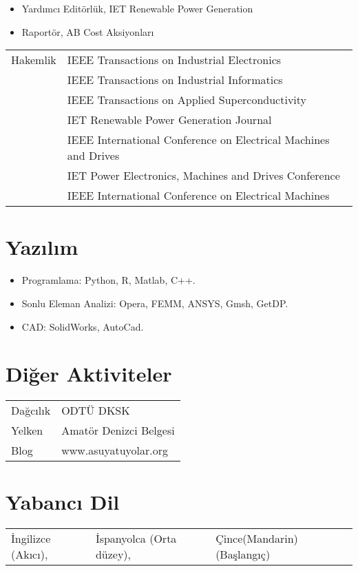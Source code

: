 \documentclass[a4paper,12pt]{article}
\begin{document}
\begin{itemize}
\item Yardımcı Editörlük, IET Renewable Power Generation
\item Raportör, AB Cost Aksiyonları
\end{itemize}

\begin{tabular}{ll}
Hakemlik & IEEE Transactions on Industrial Electronics \\
& IEEE Transactions on Industrial Informatics \\
& IEEE Transactions on Applied Superconductivity\\
& IET Renewable Power Generation Journal \\
& IEEE International Conference on Electrical Machines and Drives \\
& IET Power Electronics, Machines and Drives Conference \\
& IEEE International Conference on Electrical Machines\\
\end{tabular}


\section{Yazılım}
\begin{itemize}
\item Programlama: Python, R, Matlab, C++.
\item Sonlu Eleman Analizi: Opera, FEMM, ANSYS, Gmsh, GetDP.
\item CAD: SolidWorks, AutoCad.
\end{itemize}

\section{Diğer Aktiviteler}
%
 \begin{tabular}{ll}
Dağcılık & ODTÜ DKSK\\
Yelken & Amatör Denizci Belgesi\\
Blog & www.asuyatuyolar.org\\
\end{tabular}

\section{Yabancı Dil}
\begin{tabular}{lll} 
İngilizce (Akıcı), & İspanyolca (Orta düzey), & Çince(Mandarin) (Başlangıç)
\end{tabular}
\end{document}
